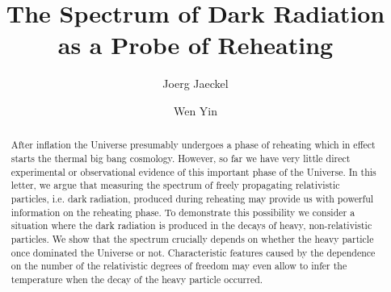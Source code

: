 \documentclass[superscriptaddress,aps,preprintnumbers,amsmath,showpacs,amssymb,prd,nofootinbib,reprint]{revtex4-1}
\begin{document}
\def\o{\over}
\def\a{\alpha}
\def\b{\beta}
\def\c{\varepsilon}
\def\d{\delta}
\def\e{\epsilon}
\def\f{\phi}
\def\g{\gamma}
\def\h{\theta}
\def\k{\kappa}
\def\l{\lambda}
\def\m{\mu}
\def\n{\nu}
\def\p{\psi}
\def\q{\partial}
\def\r{\rho}
\def\s{\sigma}
\def\t{\tau}
\def\u{\upsilon}
\def\v{\varphi}
\def\w{\omega}
\def\x{\xi}
\def\y{\eta}
\def\z{\zeta}
\def\D{\Delta}
\def\G{\Gamma}
\def\H{\Theta}
\def\L{\Lambda}
\def\F{\Phi}
\def\P{\Psi}
\def\S{\Sigma}
\def\me{\mathrm e}
\def\ol{\overline}
\def\tl{\tilde}
\def\*{\dagger}



\newcommand{\exclude}[1]{}

\def\bra{\langle}
\def\ket{\rangle}
\def\beq{\begin{equation}}
\def\eeq{\end{equation}}
\newcommand{\C}[1]{\mathcal{#1}}
\def\ov{\overline}





\title{ The Spectrum of Dark Radiation as a Probe of Reheating
}

\author{Joerg Jaeckel}
\author{Wen Yin}




\begin{abstract}
After inflation the Universe presumably undergoes a phase of reheating which in effect starts the thermal big bang cosmology. 
However, so far we have very little direct experimental or observational evidence of this important phase of the Universe.
In this letter, we argue that measuring the spectrum of freely propagating relativistic particles, i.e. dark radiation, produced during reheating may provide us with powerful information on the reheating phase. To demonstrate this possibility we consider a situation where the dark radiation is produced in the decays of heavy, non-relativistic particles. We show that the spectrum crucially depends on whether the heavy particle once dominated the Universe or not. Characteristic features caused by the dependence on the number of the relativistic degrees of freedom may even allow to infer the temperature when the decay of the heavy particle occurred.
\noindent
\end{abstract}
\maketitle
\flushbottom
\end{document}
